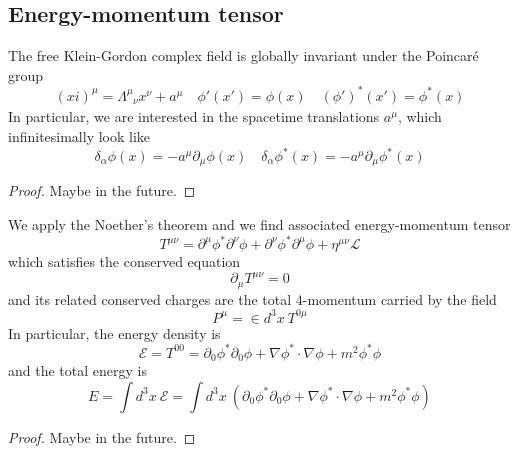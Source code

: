 \subsection{Energy-momentum tensor}

    The free Klein-Gordon complex field is globally invariant under the Poincaré group
    \begin{equation*}
        (xi)^\mu = \Lambda^\mu_{\phantom \mu \nu} x^\nu + a^\mu \quad \phi'(x') = \phi(x) \quad (\phi')^* (x') = \phi^*(x)
    \end{equation*}
    In particular, we are interested in the spacetime translations $a^\mu$, which infinitesimally look like
    \begin{equation*}
        \delta_\alpha \phi (x) = - a^\mu \partial_\mu \phi(x) \quad \delta_\alpha \phi^* (x) = - a^\mu \partial_\mu \phi^*(x)
    \end{equation*}

    \begin{proof}
        Maybe in the future.
    \end{proof}

    We apply the Noether's theorem and we find associated energy-momentum tensor
    \begin{equation*}
        T^{\mu\nu} = \partial^\mu \phi^* \partial^\nu \phi + \partial^\nu \phi^* \partial^\mu \phi + \eta^{\mu\nu} \mathcal L 
    \end{equation*}
    which satisfies the conserved equation 
    \begin{equation*}
        \partial_\mu T^{\mu\nu} = 0
    \end{equation*}
    and its related conserved charges are the total $4$-momentum carried by the field
    \begin{equation*}
        P^\mu = \in d^3 x ~ T^{0\mu}
    \end{equation*}
    In particular, the energy density is 
    \begin{equation*}
        \mathcal E = T^{00} = \partial_0 \phi^* \partial_0 \phi + \nabla \phi^* \cdot \nabla \phi + m^2 \phi^* \phi
    \end{equation*}
    and the total energy is 
    \begin{equation*}
        E = \int d^3 x ~ \mathcal E = \int d^3 x ~ (\partial_0 \phi^* \partial_0 \phi + \nabla \phi^* \cdot \nabla \phi + m^2 \phi^* \phi)
    \end{equation*}

    \begin{proof}
        Maybe in the future.
    \end{proof}

